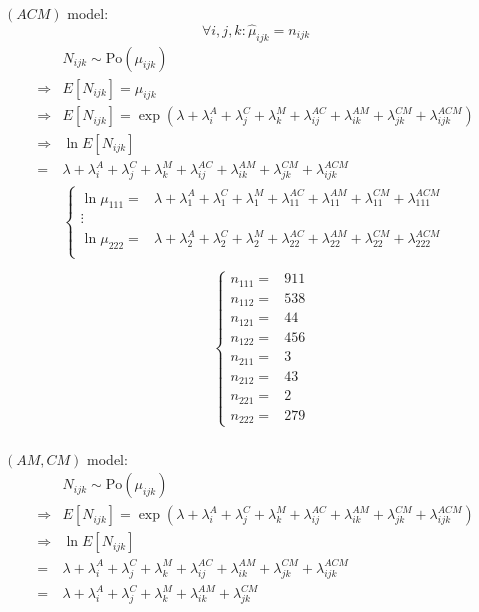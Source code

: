 \documentclass{article}
\begin{document}
\((ACM)\) model:
\[\forall i,j,k:\hat\mu_{ijk} = n_{ijk}\]
\begin{align*}
    & N_{ijk} \sim \text{Po}(\mu_{ijk}) \\
    \Rightarrow& E[N_{ijk}] = \mu_{ijk} \\
    \Rightarrow& E[N_{ijk}] = \exp(\lambda+\lambda_i^A+\lambda_j^C+\lambda_k^M+\lambda_{ij}^{AC}+\lambda_{ik}^{AM}+\lambda_{jk}^{CM}+\lambda_{ijk}^{ACM}) \\
    \Rightarrow& \ln E[N_{ijk}] \\
    =& \lambda+\lambda_i^A+\lambda_j^C+\lambda_k^M+\lambda_{ij}^{AC}+\lambda_{ik}^{AM}+\lambda_{jk}^{CM}+\lambda_{ijk}^{ACM} \\
    & \begin{cases}
    \ln\mu_{111} =& \lambda+\lambda_1^A+\lambda_1^C+\lambda_1^M+\lambda_{11}^{AC}+\lambda_{11}^{AM}+\lambda_{11}^{CM}+\lambda_{111}^{ACM} \\
    \vdots \\
    \ln\mu_{222} =& \lambda+\lambda_2^A+\lambda_2^C+\lambda_2^M+\lambda_{22}^{AC}+\lambda_{22}^{AM}+\lambda_{22}^{CM}+\lambda_{222}^{ACM} \\
    \end{cases} \\
\end{align*}
\begin{align*}
    & \begin{cases}
    n_{111} =& 911 \\
    n_{112} =& 538 \\
    n_{121} =& 44 \\
    n_{122} =& 456 \\
    n_{211} =& 3 \\
    n_{212} =& 43 \\
    n_{221} =& 2 \\
    n_{222} =& 279
    \end{cases} \\
\end{align*}

\((AM,CM)\) model:
\begin{align*}
    & N_{ijk} \sim \text{Po}(\mu_{ijk}) \\
    \Rightarrow& E[N_{ijk}] = \exp(\lambda+\lambda_i^A+\lambda_j^C+\lambda_k^M+\lambda_{ij}^{AC}+\lambda_{ik}^{AM}+\lambda_{jk}^{CM}+\lambda_{ijk}^{ACM}) \\
    \Rightarrow& \ln E[N_{ijk}] \\
    =& \lambda+\lambda_i^A+\lambda_j^C+\lambda_k^M+\lambda_{ij}^{AC}+\lambda_{ik}^{AM}+\lambda_{jk}^{CM}+\lambda_{ijk}^{ACM} \\
    =& \lambda+\lambda_i^A+\lambda_j^C+\lambda_k^M+\lambda_{ik}^{AM}+\lambda_{jk}^{CM} \\
\end{align*}
\end{document}

